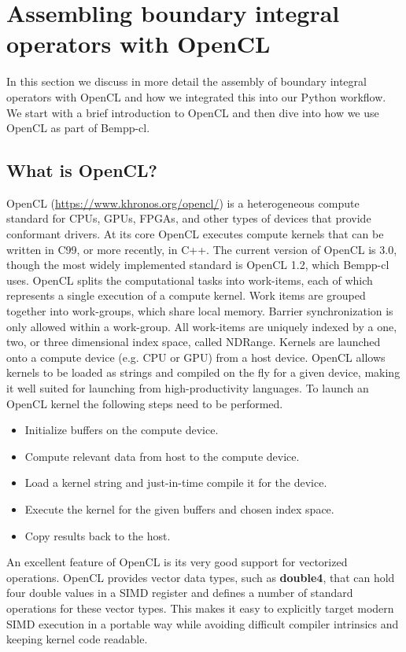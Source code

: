 \section{Assembling boundary integral operators with OpenCL}

In this section we discuss in more detail the assembly of boundary integral operators with OpenCL
and how we integrated this into our Python workflow. We start with a brief introduction to OpenCL and then
dive into how we use OpenCL as part of Bempp-cl.

\subsection{What is OpenCL?}

OpenCL (\url{https://www.khronos.org/opencl/}) is a heterogeneous compute standard for CPUs, GPUs, FPGAs, and other types of devices that provide conformant drivers. At its core OpenCL executes compute kernels that can be written in C99, or more recently, in C++. The current version of OpenCL is 3.0, though the most widely implemented standard is OpenCL 1.2, which Bempp-cl uses. OpenCL splits the computational tasks into work-items, each of which represents a single execution of a compute kernel. Work items are grouped together into work-groups, which share local memory. Barrier synchronization is only allowed within a work-group. All work-items are uniquely indexed by a one, two, or three dimensional index space, called NDRange. Kernels are launched onto a compute device (e.g. CPU or GPU) from a host device. OpenCL allows kernels to be loaded as strings and compiled on the fly for a given device, making it well suited for launching from high-productivity languages. To launch an OpenCL kernel the following steps need to be performed.
\begin{itemize}
	\item Initialize buffers on the compute device.
	\item Compute relevant data from host to the compute device.
	\item Load a kernel string and just-in-time compile it for the device.
	\item Execute the kernel for the given buffers and chosen index space.
	\item Copy results back to the host.
\end{itemize}
An excellent feature of OpenCL is its very good support for vectorized operations. OpenCL provides vector data types, such as \textbf{double4}, that can hold four double values in a SIMD register and defines a number of standard operations for these vector types. This makes it easy to explicitly target modern SIMD execution in a portable way while avoiding difficult compiler intrinsics and keeping kernel code readable.

